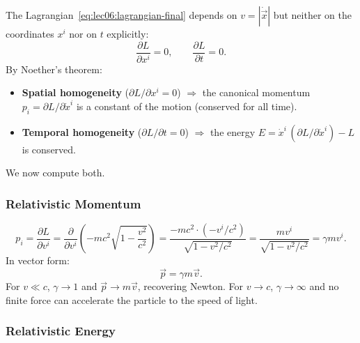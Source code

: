 The Lagrangian~\eqref{eq:lec06:lagrangian-final} depends on $v = |\dot{\vec{x}}|$
but neither on the coordinates $x^i$ nor on $t$ explicitly:
\begin{equation}\label{eq:lec06:noether-symmetries}
    \frac{\partial L}{\partial x^i} = 0, \qquad \frac{\partial L}{\partial t} = 0 .
\end{equation}
By Noether's theorem:
\begin{itemize}
    \item \textbf{Spatial homogeneity} ($\partial L/\partial x^i = 0$)
      $\Rightarrow$ the canonical momentum $p_i = \partial L/\partial \dot x^i$
      is a constant of the motion (conserved for all time).
    \item \textbf{Temporal homogeneity} ($\partial L/\partial t = 0$)
      $\Rightarrow$ the energy $E = \dot x^i\,(\partial L/\partial \dot x^i) - L$
      is conserved.
\end{itemize}
We now compute both.

\subsubsection*{Relativistic Momentum}

\begin{equation}\label{eq:lec06:momentum-calc}
    p_i = \frac{\partial L}{\partial v^i}
        = \frac{\partial}{\partial v^i}\!\left(-mc^2\sqrt{1-\frac{v^2}{c^2}}\right)
        = \frac{-mc^2 \cdot (-v^i/c^2)}{\sqrt{1-v^2/c^2}}
        = \frac{m v^i}{\sqrt{1-v^2/c^2}} = \gamma m v^i .
\end{equation}
In vector form:
\begin{equation}\label{eq:lec06:momentum}
    \boxed{\vec{p} = \gamma m \vec{v}} .
\end{equation}
For $v \ll c$, $\gamma \to 1$ and $\vec{p} \to m\vec{v}$, recovering Newton.
For $v \to c$, $\gamma \to \infty$ and no finite force can accelerate the
particle to the speed of light.

\subsubsection*{Relativistic Energy}

